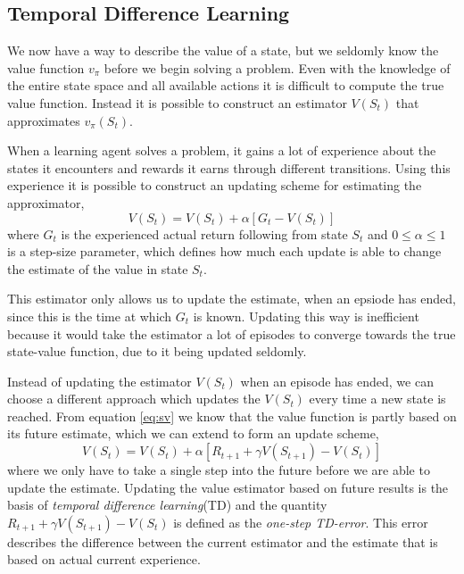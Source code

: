 \documentclass[11pt]{article}
\begin{document}
\maketitle

\subsection{Temporal Difference Learning}\label{sec:td}

We now have a way to describe the value of a state, but we seldomly know the
value function $v_\pi$ before we begin solving a problem.
Even with the knowledge of the entire state space and all available actions
it is difficult to compute the true value function.
Instead it is possible to construct an estimator $V(S_t)$ that
approximates $v_\pi(S_t)$.

When a learning agent solves a problem, it gains a lot of experience
about the states it encounters and rewards it earns through different transitions.
Using this experience it is possible to construct an updating scheme
for estimating the approximator,
\begin{equation}
    V(S_t) = V(S_t) + \alpha [G_t - V(S_t)]
\end{equation}
where $G_t$ is the experienced actual return following from state
$S_t$ and $0 \leq \alpha \leq 1$ is a step-size parameter, 
which defines how much each update is able to change the estimate
of the value in state $S_t$.

This estimator only allows us to update the estimate, when an epsiode
has ended, since this is the time at which $G_t$ is known.
Updating this way is inefficient because it would take the estimator
a lot of episodes to converge towards the true state-value function,
due to it being updated seldomly. 

Instead of updating the estimator $V(S_t)$ when an episode has
ended, we can choose a different approach which updates the $V(S_t)$
every time a new state is reached.
From equation \ref{eq:sv} we know that the value function is partly based on its future
estimate, which we can extend to form an update scheme,
\begin{equation}
    V(S_t) = V(S_t) + \alpha  [R_{t+1} + \gamma  V(S_{t+1}) - V(S_t)]
\end{equation}
where we only have to take a single step into the future before we are
able to update the estimate.
Updating the value estimator based on future results is the basis
of \textit{temporal difference learning}(TD) and the quantity $R_{t+1} + \gamma  V(S_{t+1}) - V(S_t)$
is defined as the \textit{one-step TD-error}.
This error describes the difference between the current estimator
and the estimate that is based on actual current experience.
\end{document}
